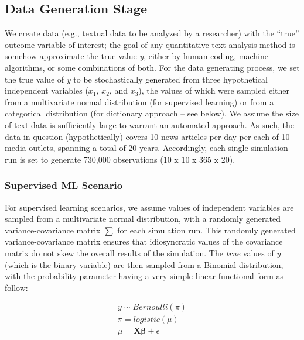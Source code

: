 \documentclass[man, 12pt, a4paper, nolmodern, noextraspace]{apa6}
\begin{document}
    \subsection{Data Generation Stage}
    
    We create data (e.g., textual data to be analyzed by a researcher) with the \enquote{true} outcome variable of interest; the goal of any quantitative text analysis method is somehow approximate the true value \textit{y}, either by human coding, machine algorithms, or some combinations of both. For the data generating process, we set the true value of \textit{y} to be stochastically generated from three hypothetical independent variables ($x_1$, $x_2$, and $x_3$), the values of which were sampled either from a multivariate normal distribution (for supervised learning) or from a categorical distribution (for dictionary approach -- see below). We assume the size of text data is sufficiently large to warrant an automated approach. As such, the data in question (hypothetically) covers 10 news articles per day per each of 10 media outlets, spanning a total of 20 years. Accordingly, each single simulation run is set to generate 730,000 observations (10 x 10 x 365 x 20).
    
    \subsubsection{Supervised ML Scenario}
    For supervised learning scenarios, we assume values of independent variables are sampled from a multivariate normal distribution, with a randomly generated variance-covariance matrix \textbf{$\sum$} for each simulation run. This randomly generated variance-covariance matrix ensures that idiosyncratic values of the covariance matrix do not skew the overall results of the simulation. The \textit{true}  values of $y$ (which is the binary variable) are then sampled from a Binomial distribution, with the probability parameter having a very simple linear functional form as follow:
    
    
    \begin{equation}
        \begin{gathered}
            y \sim Bernoulli(\pi) \\
            \pi = logistic(\mu) \\
            \mu = \boldsymbol{X\beta} + \epsilon
        \end{gathered}
    \end{equation}
    
\end{document}
